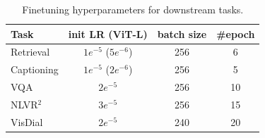 \begin{table}[!h]
	\centering	
	\begin{tabular}	{l   |  c  c  c }
		\toprule	 	
	 Task & init LR (ViT-L) & batch size & \#epoch \\
	 \midrule
	 Retrieval & $1e^{-5}$ ($5e^{-6}$) & 256 & 6  \\
	 Captioning & $1e^{-5}$ ($2e^{-6}$) & 256 & 5 \\
	 VQA & $2e^{-5}$ & 256 & 10 \\
	 NLVR$^2$ & $3e^{-5}$ & 256 & 15 \\
	 VisDial & $2e^{-5}$ & 240 & 20 \\ 		
		
		\bottomrule
	\end{tabular}
 	 \vspace{-1ex}	
	\caption
	{
	\small	
		Finetuning hyperparameters for downstream tasks.
	}
	\label{tbl:paramter}
 \vspace{-2ex}	
\end{table}		
